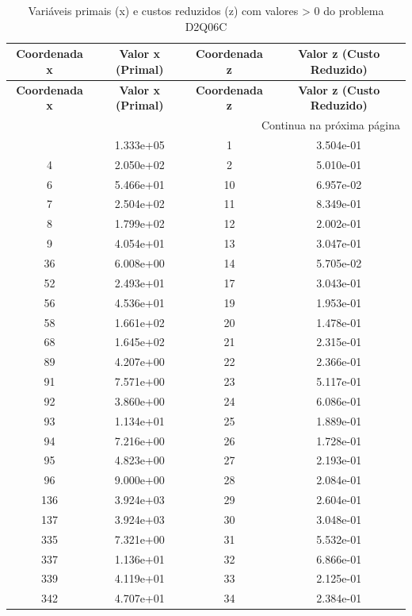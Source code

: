 \documentclass[12pt]{article}
\begin{document}
\begin{longtable}{@{}cccc@{}}
\caption{Variáveis primais (x) e custos reduzidos (z) com valores > 0 do problema D2Q06C} \\
\toprule
\textbf{Coordenada x} & \textbf{Valor x (Primal)} & \textbf{Coordenada z} & \textbf{Valor z (Custo Reduzido)} \\
\midrule
\endfirsthead

\toprule
\textbf{Coordenada x} & \textbf{Valor x (Primal)} & \textbf{Coordenada z} & \textbf{Valor z (Custo Reduzido)} \\
\midrule
\endhead

\midrule \multicolumn{4}{r}{{Continua na próxima página}} \\ \midrule
\endfoot

\bottomrule
\endlastfoot
3 & 1.333e+05 & 1 & 3.504e-01 \\
4 & 2.050e+02 & 2 & 5.010e-01 \\
6 & 5.466e+01 & 10 & 6.957e-02 \\
7 & 2.504e+02 & 11 & 8.349e-01 \\
8 & 1.799e+02 & 12 & 2.002e-01 \\
9 & 4.054e+01 & 13 & 3.047e-01 \\
36 & 6.008e+00 & 14 & 5.705e-02 \\
52 & 2.493e+01 & 17 & 3.043e-01 \\
56 & 4.536e+01 & 19 & 1.953e-01 \\
58 & 1.661e+02 & 20 & 1.478e-01 \\
68 & 1.645e+02 & 21 & 2.315e-01 \\
89 & 4.207e+00 & 22 & 2.366e-01 \\
91 & 7.571e+00 & 23 & 5.117e-01 \\
92 & 3.860e+00 & 24 & 6.086e-01 \\
93 & 1.134e+01 & 25 & 1.889e-01 \\
94 & 7.216e+00 & 26 & 1.728e-01 \\
95 & 4.823e+00 & 27 & 2.193e-01 \\
96 & 9.000e+00 & 28 & 2.084e-01 \\
136 & 3.924e+03 & 29 & 2.604e-01 \\
137 & 3.924e+03 & 30 & 3.048e-01 \\
335 & 7.321e+00 & 31 & 5.532e-01 \\
337 & 1.136e+01 & 32 & 6.866e-01 \\
339 & 4.119e+01 & 33 & 2.125e-01 \\
342 & 4.707e+01 & 34 & 2.384e-01 \\

\end{longtable}
\end{document}
